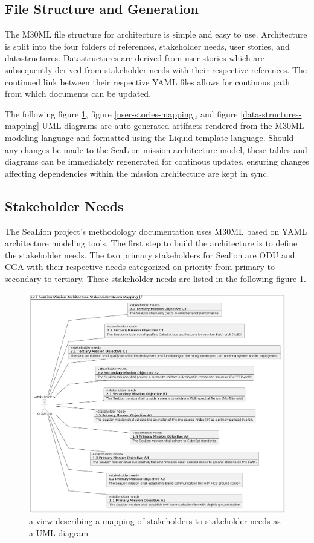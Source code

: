 \documentclass[conf]{new-aiaa}
\begin{document}
\subsection{File Structure and Generation}

The M30ML file structure for architecture is simple and easy to use. Architecture is split into the four folders of references, stakeholder needs, user stories, and datastructures. Datastructures are derived from user stories which are subsequently derived from stakeholder needs with their respective references. The continued link between their respective YAML files allows for continous path from which documents can be updated.

The following figure \ref{stakeholder-needs-mapping}, figure \ref{user-stories-mapping}, and figure \ref{data-structures-mapping} UML diagrams are auto-generated artifacts rendered from the M30ML modeling language and formatted using the Liquid template language. Should any changes be made to the SeaLion mission architecture model, these tables and diagrams can be immediately regenerated for continous updates, ensuring changes affecting dependencies within the mission architecture are kept in sync.

\subsection{Stakeholder Needs}

The SeaLion project's methodology documentation uses M30ML based on YAML architecture modeling tools. The first step to build the architecture is to define the stakeholder needs. The two primary stakeholders for Sealion are ODU and CGA with their respective needs categorized on priority from primary to secondary to tertiary. These stakeholder needs are listed in the following figure \ref{stakeholder-needs-mapping}.

\begin{figure}[hbt!]
    \centering
    \includegraphics[width=.8\textwidth]{stakeholder-needs-mapping}
    \caption{a view describing a mapping of stakeholders to stakeholder needs as a UML diagram}
    \label{stakeholder-needs-mapping}
\end{figure}
\end{document}
